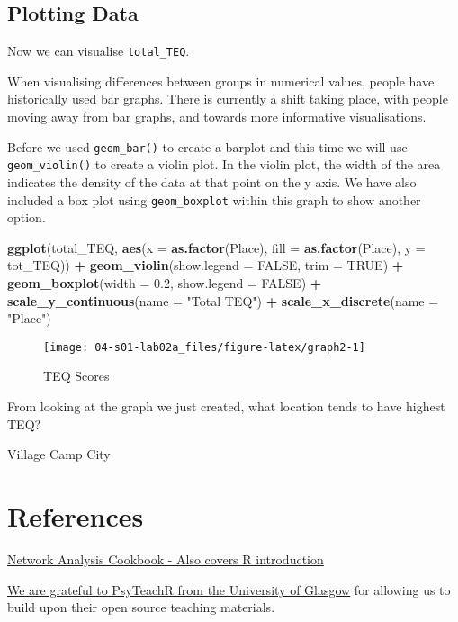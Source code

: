 \documentclass[]{book}
\newenvironment{Shaded}{\begin{snugshade}}{\end{snugshade}}
\newcommand{\KeywordTok}[1]{\textcolor[rgb]{0.13,0.29,0.53}{\textbf{#1}}}
\newcommand{\DataTypeTok}[1]{\textcolor[rgb]{0.13,0.29,0.53}{#1}}
\newcommand{\FloatTok}[1]{\textcolor[rgb]{0.00,0.00,0.81}{#1}}
\newcommand{\StringTok}[1]{\textcolor[rgb]{0.31,0.60,0.02}{#1}}
\newcommand{\OtherTok}[1]{\textcolor[rgb]{0.56,0.35,0.01}{#1}}
\newcommand{\OperatorTok}[1]{\textcolor[rgb]{0.81,0.36,0.00}{\textbf{#1}}}
\newcommand{\NormalTok}[1]{#1}
\begin{document}
\section{Plotting Data}\label{plotting-data}

Now we can visualise \texttt{total\_TEQ}.

When visualising differences between groups in numerical values, people
have historically used bar graphs. There is currently a shift taking
place, with people moving away from bar graphs, and towards more
informative visualisations.

Before we used \texttt{geom\_bar()} to create a barplot and this time we
will use \texttt{geom\_violin()} to create a violin plot. In the violin
plot, the width of the area indicates the density of the data at that
point on the y axis. We have also included a box plot using
\texttt{geom\_boxplot} within this graph to show another option.

\begin{Shaded}
\begin{Highlighting}[]
\KeywordTok{ggplot}\NormalTok{(total_TEQ, }\KeywordTok{aes}\NormalTok{(}\DataTypeTok{x =} \KeywordTok{as.factor}\NormalTok{(Place), }\DataTypeTok{fill =} \KeywordTok{as.factor}\NormalTok{(Place), }\DataTypeTok{y =}\NormalTok{ tot_TEQ)) }\OperatorTok{+}\StringTok{ }\KeywordTok{geom_violin}\NormalTok{(}\DataTypeTok{show.legend =} \OtherTok{FALSE}\NormalTok{, }\DataTypeTok{trim =} \OtherTok{TRUE}\NormalTok{) }\OperatorTok{+}
\StringTok{  }\KeywordTok{geom_boxplot}\NormalTok{(}\DataTypeTok{width =} \FloatTok{0.2}\NormalTok{, }\DataTypeTok{show.legend =} \OtherTok{FALSE}\NormalTok{) }\OperatorTok{+}
\StringTok{  }\KeywordTok{scale_y_continuous}\NormalTok{(}\DataTypeTok{name =} \StringTok{"Total TEQ"}\NormalTok{) }\OperatorTok{+}
\StringTok{  }\KeywordTok{scale_x_discrete}\NormalTok{(}\DataTypeTok{name =} \StringTok{"Place"}\NormalTok{)}
\end{Highlighting}
\end{Shaded}

\begin{figure}

{\centering \texttt{[image: 04-s01-lab02a\_files/figure-latex/graph2-1]} 

}

\caption{TEQ Scores}\label{fig:graph2}
\end{figure}

From looking at the graph we just created, what location tends to have
highest TEQ?

 Village Camp City

\appendix


\chapter{References}\label{references}

\href{http://sachaepskamp.com/files/Cookbook.html}{Network Analysis
Cookbook - Also covers R introduction}

\href{https://psyteachr.github.io/}{We are grateful to PsyTeachR from
the University of Glasgow} for allowing us to build upon their open
source teaching materials.


\end{document}
